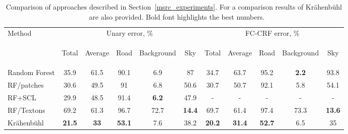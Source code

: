 \begin{table}[t]
 \centering
 \begin{tabular}{|l|c|c|c|c|c||c|c|c|c|c|}
 \hline
  \multirow{2}{*}{Method} & \multicolumn{5}{|c||}{Unary error, \%} & \multicolumn{5}{|c|}{FC-CRF error, \%} \\
  \cline{2-11}
   & \begin{sideways}Total\end{sideways} & \begin{sideways}Average\end{sideways} & \begin{sideways}Road\end{sideways} & \begin{sideways}Background\end{sideways} & \begin{sideways}Sky\end{sideways} & \begin{sideways}Total\end{sideways} & \begin{sideways}Average\end{sideways} & \begin{sideways}Road\end{sideways} & \begin{sideways}Background\end{sideways} & \begin{sideways}Sky\end{sideways} \\
  \hline
  Random Forest & 35.9 & 61.5 & 90.1 & 6.9 & 87 & 34.7 & 63.7 & 95.2 & {\bf 2.2} & 93.8 \\
  RF/patches & 30.6 & 49.5 & 91 & 6.8 & 50.6 & 30.7 & 50.7 & 92.1 & 5.8 & 54.1 \\
  RF+SCL & 29.9 & 48.5 & 91.4 & {\bf 6.2} & 47.9 & - & - & - & - & - \\
  RF/Textons & 69.2 & 61.3 & 96.7 & 72.7 & {\bf 14.4} & 69.7 & 61.4 & 97.4 & 73.3 & {\bf 13.6} \\
  \hline
  \hline
  Kr\"ahenb\"uhl~\cite{Krahenbuhl2011} & {\bf 21.5} & {\bf 33} & {\bf 53.1} & 7.6 & 38.2 & {\bf 20.2} & {\bf 31.4} & {\bf 52.7} & 6.5 & 35 \\
  \hline
 \end{tabular}
  \caption{Comparison of approaches described in Section~\ref{msrc_experiments}. For a comparison results of Kr\"ahenb\"uhl \etal~\cite{Krahenbuhl2011}
  are also provided.
  Bold font highlights the best numbers.}
\label{tab:new_set_normal_features}
\end{table}

